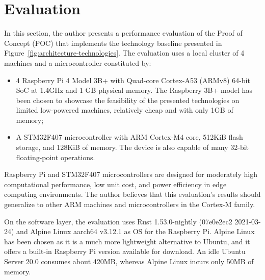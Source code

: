 
\section{Evaluation}
\label{sec:evaluation}

In this section, the author presents a performance evaluation of the Proof of Concept (POC) that implements the technology baseline presented in Figure~\ref{fig:architecture-technologies}. The evaluation uses a local cluster of 4 machines and a microcontroller constituted by:

\begin{itemize}
    \item 4 Raspberry Pi 4 Model 3B+ with Quad-core Cortex-A53 (ARMv8) 64-bit SoC at 1.4GHz and 1 GB physical memory. The Raspberry 3B+ model has been chosen to showcase the feasibility of the presented technologies on limited low-powered machines, relatively cheap and with only 1GB of memory;
    \item A STM32F407 microcontroller with ARM Cortex-M4 core, 512KiB flash storage, and 128KiB of memory. The device is also capable of many 32-bit floating-point operations.
\end{itemize}

Raspberry Pi and STM32F407 microcontrollers are designed for moderately high computational performance, low unit cost, and power efficiency in edge computing environments. The author believes that this evaluation's results should generalize to other ARM machines and microcontrollers in the Cortex-M family.

On the software layer, the evaluation uses Rust 1.53.0-nightly (07e0e2ec2 2021-03-24) and Alpine Linux aarch64 v3.12.1 as OS for the Raspberry Pi. Alpine Linux has been chosen as it is a much more lightweight alternative to Ubuntu, and it offers a built-in Raspberry Pi version available for download. An idle Ubuntu Server 20.0 consumes about 420MB, whereas Alpine Linux incurs only 50MB of memory.


